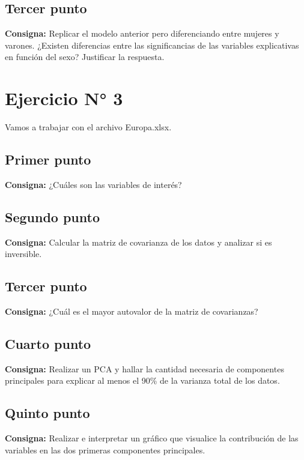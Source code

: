 \documentclass{article} %
\begin{document}
\subsection{Tercer punto}

\textbf{Consigna:} Replicar el modelo anterior pero diferenciando entre mujeres y varones. ¿Existen diferencias entre las significancias de las variables explicativas en función del sexo? Justificar la respuesta.



\section{Ejercicio N° 3}

Vamos a trabajar con el archivo Europa.xlsx.

\subsection{Primer punto}

\textbf{Consigna:} ¿Cuáles son las variables de interés?

\subsection{Segundo punto}

\textbf{Consigna:} Calcular la matriz de covarianza de los datos y analizar si es inversible.

\subsection{Tercer punto}

\textbf{Consigna:} ¿Cuál es el mayor autovalor de la matriz de covarianzas?

\subsection{Cuarto punto}

\textbf{Consigna:} Realizar un PCA y hallar la cantidad necesaria de componentes principales para explicar al menos el 90\% de la varianza total de los datos.

\subsection{Quinto punto}

\textbf{Consigna:} Realizar e interpretar un gráfico que visualice la contribución de las variables en las dos primeras componentes principales.
\end{document}
